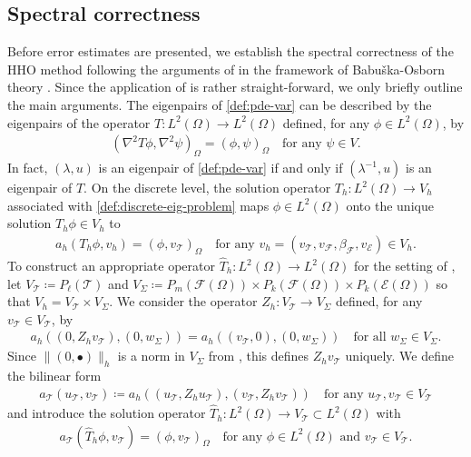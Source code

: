 \documentclass[a4paper]{amsart}
\numberwithin{equation}{section}
\def\F{\mathcal{F}}
\def\E{\mathcal{E}}
\def\T{\mathcal{T}}
\theoremstyle{definition}
\theoremstyle{remark}
\numberwithin{theorem}{section}
\numberwithin{equation}{section}
\numberwithin{table}{section}
\numberwithin{figure}{section}
\begin{document}
\subsection{Spectral correctness}
Before error estimates are presented, we establish the spectral correctness of the HHO method following the arguments of \cite{CaloCicuttinDengErn2019} in the framework of Babu\v{s}ka-Osborn theory \cite{BabuskaOsborn1991}. Since the application of \cite{CaloCicuttinDengErn2019} is rather straight-forward, we only briefly outline the main arguments.
The eigenpairs of \eqref{def:pde-var} can be described by the eigenpairs of the operator $T : L^2(\Omega) \to L^2(\Omega)$ defined, for any $\phi \in L^2(\Omega)$, by
\begin{align*}
	(\nabla^2 T \phi, \nabla^2 \psi)_\Omega = (\phi, \psi)_\Omega \quad\text{for any } \psi \in V.
\end{align*}
In fact, $(\lambda,u)$ is an eigenpair of \eqref{def:pde-var} if and only if $(\lambda^{-1},u)$ is an eigenpair of $T$.
On the discrete level, the solution operator $T_h : L^2(\Omega) \to V_h$ associated with \eqref{def:discrete-eig-problem} maps $\phi \in L^2(\Omega)$ onto the unique solution $T_h \phi \in V_h$ to
\begin{align}\label{def:Th}
	a_h(T_h \phi, v_h) = (\phi, v_\T)_\Omega \quad\text{for any } v_h = (v_\T, v_\F, \beta_{\F}, v_\E) \in V_h.
\end{align}
To construct an appropriate operator $\hat{T}_h : L^2(\Omega) \to L^2(\Omega)$ for the setting of \cite{BabuskaOsborn1991},
let $V_\T \coloneqq P_\ell(\T)$ and $V_\Sigma \coloneqq P_m(\F(\Omega)) \times P_k(\F(\Omega)) \times P_k(\E(\Omega))$ so that $V_h = V_\T \times V_\Sigma$.
We consider the operator $Z_h : V_\T \to V_\Sigma$ defined, for any $v_\T \in V_\T$, by
\begin{align*}
	a_h((0, Z_h v_\T), (0, w_\Sigma)) = a_h((v_\T,0),(0,w_\Sigma)) \quad\text{for all } w_\Sigma \in V_\Sigma.
\end{align*}
Since $\|(0,\bullet)\|_h$ is a norm in $V_\Sigma$ from , this defines $Z_h v_\T$ uniquely.
We define the bilinear form
\begin{align*}
	a_\T(u_\T, v_\T) \coloneqq a_h((u_\T, Z_h u_\T), (v_\T, Z_h v_\T)) \quad\text{for any } u_\T, v_\T \in V_\T
\end{align*}
and introduce the solution operator $\hat{T}_h : L^2(\Omega) \to V_\T \subset L^2(\Omega)$ with
\begin{align*}
	a_\T(\hat{T}_h \phi, v_\T) = (\phi, v_\T)_\Omega \quad\text{for any } \phi \in L^2(\Omega) \text{ and } v_\T \in V_\T.
\end{align*}
\end{document}
